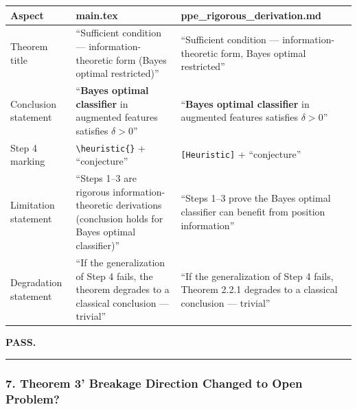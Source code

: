 \documentclass[
  12pt,
]{article}
\begin{document}
\begin{longtable}[]{@{}
  >{\raggedright\arraybackslash}p{}
  >{\raggedright\arraybackslash}p{}
  >{\raggedright\arraybackslash}p{}@{}}
\toprule\noalign{}
\begin{minipage}[b]{\linewidth}\raggedright
Aspect
\end{minipage} & \begin{minipage}[b]{\linewidth}\raggedright
main.tex
\end{minipage} & \begin{minipage}[b]{\linewidth}\raggedright
ppe\_rigorous\_derivation.md
\end{minipage} \\
\midrule\noalign{}
\endhead
\bottomrule\noalign{}
\endlastfoot
Theorem title & ``Sufficient condition --- information-theoretic form (Bayes optimal restricted)'' & ``Sufficient condition --- information-theoretic form, Bayes optimal restricted'' \\
Conclusion statement & ``\textbf{Bayes optimal classifier} in augmented features satisfies $\delta>0$'' & ``\textbf{Bayes optimal classifier} in augmented features satisfies $\delta>0$'' \\
Step 4 marking & \texttt{{\textbackslash}heuristic\{\}} + ``conjecture'' & \texttt{[Heuristic]} + ``conjecture'' \\
Limitation statement & ``Steps 1--3 are rigorous information-theoretic derivations (conclusion holds for Bayes optimal classifier)'' & ``Steps 1--3 prove the Bayes optimal classifier can benefit from position information'' \\
Degradation statement & ``If the generalization of Step 4 fails, the theorem degrades to a classical conclusion --- trivial'' & ``If the generalization of Step 4 fails, Theorem 2.2.1 degrades to a classical conclusion --- trivial'' \\
\end{longtable}

\textbf{PASS.}

\begin{center}\rule{0.5\linewidth}{0.5pt}\end{center}

\subsubsection{7. Theorem 3' Breakage Direction Changed to Open Problem?}\label{thm-3prime-open-problem}
\end{document}
